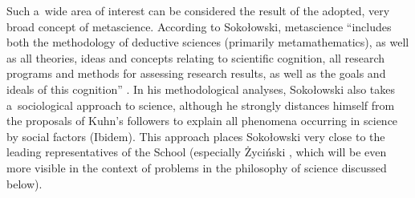 \documentclass[%
  manuscript=article,
  year=2024,
  volume=77,
  doi=00000.000,
]{zfn}
\begin{document}
Such a~wide area of interest can be considered the result of the adopted, very broad concept of metascience. According to Sokołowski, metascience ``includes both the methodology of deductive sciences (primarily metamathematics), as well as all theories, ideas and concepts relating to scientific cognition, all research programs and methods for assessing research results, as well as the goals and ideals of this cognition''
\parencite[][p.57]{Sokoowski1999Maa}. %
 In his methodological analyses, Sokołowski also takes a~sociological approach to science, although he strongly distances himself from the proposals of Kuhn's followers to explain all phenomena occurring in science by social factors (Ibidem). This approach places Sokołowski very close to the leading representatives of the School (especially Życiński
\parencite[see e.g.,][]{Zycinski1993Granice}, %
 which will be even more visible in the context of problems in the philosophy of science discussed below).
\end{document}
